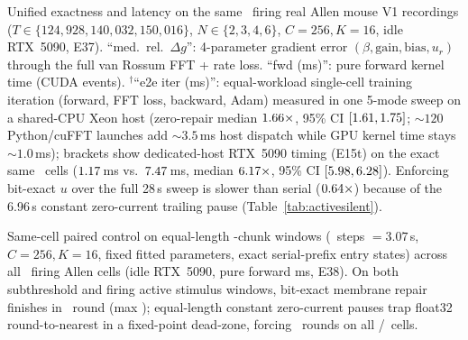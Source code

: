 \documentclass[10pt]{article}
\theoremstyle{remark}
\begin{document}
\begin{table}[t]
\centering\scriptsize
\setlength{\tabcolsep}{3pt}

\caption{Unified exactness and latency on the same \RealAuditCells\ firing real Allen mouse V1 recordings ($T\in\{124{,}928,140{,}032,150{,}016\}$, $N\in\{2,3,4,6\}$, $C=256, K=16$, idle RTX~5090, E37). ``med.\ rel.\ $\Delta g$'': 4-parameter gradient error $(\beta,\text{gain},\text{bias},u_r)$ through the full van Rossum FFT + rate loss. ``fwd (ms)'': pure forward kernel time (CUDA events). $^\dagger$``e2e iter (ms)'': equal-workload single-cell training iteration (forward, FFT loss, backward, Adam) measured in one 5-mode sweep on a shared-CPU Xeon host (zero-repair median $\RealAuditRZeroIterX\times$, 95\% CI $[\RealAuditRZeroIterXLo,\RealAuditRZeroIterXHi]$; $\sim 120$ Python/cuFFT launches add $\sim 3.5$\,ms host dispatch while GPU kernel time stays $\sim 1.0$\,ms); brackets show dedicated-host RTX~5090 timing (E15t) on the exact same \RealAuditCells\ cells ($\RealAuditQuietRZeroMs$\,ms vs.\ $\RealAuditQuietSerMs$\,ms, median $\RealAuditQuietRZeroX\times$, 95\% CI $[\RealAuditQuietRZeroXLo,\RealAuditQuietRZeroXHi]$). Enforcing bit-exact $u$ over the full 28\,s sweep is slower than serial ($\RealAuditExactIterX\times$) because of the 6.96\,s constant zero-current trailing pause (Table~\ref{tab:activesilent}).}
\label{tab:real_e2e}
\end{table}

\begin{table}[t]
\centering\footnotesize
\setlength{\tabcolsep}{4pt}

\caption{Same-cell paired control on equal-length \WinCtrlChunks-chunk windows (\WinCtrlSteps\ steps $=3.07$\,s, $C=256, K=16$, fixed fitted parameters, exact serial-prefix entry states) across all \WinCtrlCells\ firing Allen cells (idle RTX~5090, pure forward ms, E38). On both subthreshold and firing active stimulus windows, bit-exact membrane repair finishes in \WinCtrlLateActRepMed\ round (max \WinCtrlLateActRepMax); equal-length constant zero-current pauses trap float32 round-to-nearest in a fixed-point dead-zone, forcing \WinCtrlLateSilRepMed\ rounds on all \WinCtrlLateSilGtAct/\WinCtrlCells\ cells.}
\label{tab:activesilent}
\end{table}
\end{document}
